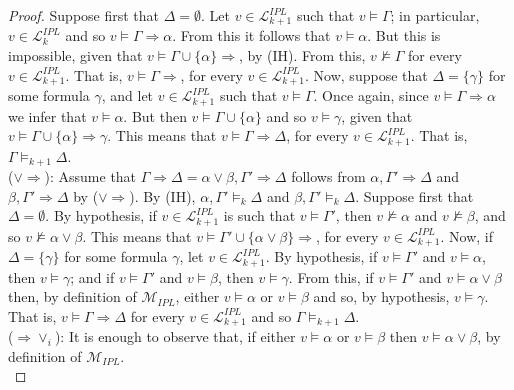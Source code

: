 \documentclass[10pt,a4paper]{amsart}
\begin{document}
\begin{proof}
Suppose first that $\Delta=\emptyset$.  Let $v \in \mathcal{L}_{k+1}^{IPL}$ such that $v \models\Gamma$; in particular, $v \in \mathcal{L}_{k}^{IPL}$ and so $v \models\Gamma\Rightarrow\alpha$. From this it follows that  $v\models\alpha$. But this is impossible, given that $v \models \Gamma \cup\{\alpha\} \Rightarrow$, by (IH). From this, $v \not\models\Gamma$ for every $v\in \mathcal{L}_{k+1}^{IPL}$. That is, $v\models\Gamma\Rightarrow$, for every $v\in \mathcal{L}_{k+1}^{IPL}$. Now, suppose that $\Delta=\{\gamma\}$ for some formula $\gamma$, and let $v\in \mathcal{L}_{k+1}^{IPL}$ such that $v \models \Gamma$. Once again, since $v \models\Gamma\Rightarrow\alpha$ we infer that  $v\models\alpha$. But then $v \models \Gamma \cup \{\alpha\}$ and so $v\models\gamma$, given that $v \models\Gamma \cup\{\alpha\}\Rightarrow \gamma$. This means that $v \models \Gamma\Rightarrow\Delta$, for every $v\in \mathcal{L}_{k+1}^{IPL}$. That is, $\Gamma\models_{k+1}\Delta$.\\[1mm]
%
($\vee\Rightarrow$): Assume that  $\Gamma \Rightarrow\Delta=\alpha \vee\beta,\Gamma' \Rightarrow\Delta$ follows from $\alpha, \Gamma'\Rightarrow\Delta$ and $\beta, \Gamma'\Rightarrow\Delta$ by ($\vee\Rightarrow$). By (IH),  $\alpha, \Gamma' \models_k \Delta$ and $\beta, \Gamma' \models_k \Delta$. Suppose first that $\Delta=\emptyset$. By hypothesis, if $v \in \mathcal{L}_{k+1}^{IPL}$ is such that $v\models\Gamma'$, then $v\not\models\alpha$ and $v\not\models\beta$, and so $v\not\models\alpha \vee\beta$. This means that $v \models \Gamma' \cup \{\alpha\vee\beta\}\Rightarrow$, for every $v\in \mathcal{L}_{k+1}^{IPL}$. Now, if $\Delta=\{\gamma\}$ for some formula $\gamma$, let $v\in \mathcal{L}_{k+1}^{IPL}$. By hypothesis, if  $v\models\Gamma'$ and $v\models\alpha$, then $v\models\gamma$; and if  $v\models\Gamma'$ and $v\models\beta$, then $v\models\gamma$. From this, if  $v\models\Gamma'$ and $v\models\alpha\vee\beta$ then, by definition of $\mathcal{M}_{IPL}$, either $v\models\alpha$ or $v\models\beta$  and so, by hypothesis,  $v\models\gamma$. That is, $v \models \Gamma\Rightarrow\Delta$ for every $v\in \mathcal{L}_{k+1}^{IPL}$ and so  $\Gamma\models_{k+1}\Delta$.\\[1mm]
%
($\Rightarrow\vee_i$): It is enough to observe that, if either $v\models \alpha$ or $v\models \beta$ then $v\models \alpha\vee\beta$, by definition of $\mathcal{M}_{IPL}$.\\[1mm]
%

\end{proof}
\end{document}
